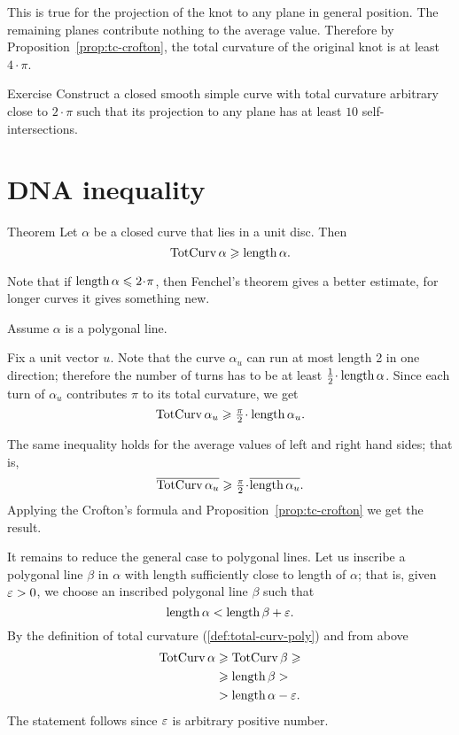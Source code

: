 This is true for the projection of the knot to any plane in general position.
The remaining planes contribute nothing to the average value.
Therefore by Proposition~\ref{prop:tc-crofton}, the total curvature of the original knot is at least $4\cdot\pi$.
\qeds



\begin{thm}{Exercise}
Construct a closed smooth simple curve with total curvature arbitrary close to $2\cdot\pi$ such that its projection to any plane has at least $10$ self-intersections.   
\end{thm}

\section{DNA inequality}


\begin{thm}{Theorem}
Let $\alpha$ be a closed curve that lies in a unit disc.
Then 
\[\mathop{\rm TotCurv}\nolimits\alpha\geqslant \mathop{\rm length}\nolimits\alpha.\]
\end{thm}

Note that if $\length\alpha\le2\cdot\pi$, then Fenchel's theorem gives a better estimate,
for longer curves it gives something new.

Assume $\alpha$ is a polygonal line.

Fix a unit vector $u$.
Note that the curve $\alpha_u$ can run at most length 2 in one direction;
therefore the number of turns has to be at least $\tfrac12\cdot\length\alpha$.
Since each turn of $\alpha_u$ contributes $\pi$ to its total curvature, we get
\[\tc\alpha_u\ge \tfrac\pi2\cdot\length\alpha_u.\]

The same inequality holds for the average values of left and right hand sides;
that is,
\[\overline{\tc\alpha_u}
\ge \tfrac\pi2\cdot\overline{\length\alpha_u}.\]
Applying the Crofton's formula and Proposition~\ref{prop:tc-crofton} we get the result.

It remains to reduce the general case to polygonal lines.
Let us inscribe a polygonal line $\beta$ in $\alpha$ with length sufficiently close to length of $\alpha$;
that is, given $\varepsilon>0$, we choose an inscribed polygonal line $\beta$ such that 
\[\mathop{\rm length}\nolimits \alpha<\mathop{\rm length}\nolimits \beta+\varepsilon.\]
By the definition of total curvature (\ref{def:total-curv-poly}) and from above
\begin{align*}
\mathop{\rm TotCurv}\nolimits\alpha&\geqslant\mathop{\rm TotCurv}\nolimits\beta\geqslant
\\
&\geqslant \mathop{\rm length}\nolimits\beta>
\\
&>\mathop{\rm length}\nolimits\alpha-\varepsilon.
\end{align*}
The statement follows since $\varepsilon$ is arbitrary positive number. 
\qeds

